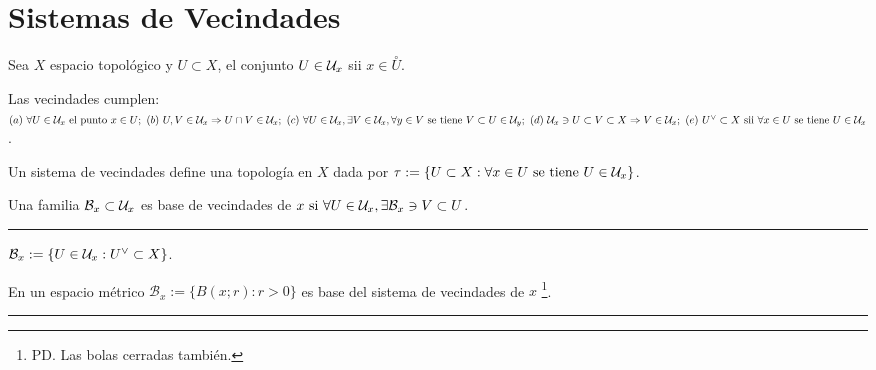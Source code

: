 \section*{Sistemas de Vecindades}

\begin{definition}
    Sea \(X\) espacio topológico y \(U\subset X\), el conjunto \( U \in \mathcal{U}_x\) sii \(x\in \overset{\circ}{U}\). 
\end{definition}
\begin{proposition}
    Las vecindades cumplen: \((a)\ \forall  U\in \U_x \text{ el punto } x\in U  ;  \ (b)\ U,V\in \U_x \Rightarrow U\cap V \in \U_x; \ (c)\ \forall  U\in \U_x, \exists    V \in \U_x, \forall y\in V \text{ se tiene } V \subset U \in \U_y; \ (d)\ \U_x \ni U\subset V\subset X\Rightarrow  V\in \U_x; \ (e) \ U^\ab\subset X \text{ sii } \forall x\in U \text{ se tiene } U\in \U_x \).  
\end{proposition}
\begin{note}
    Un sistema de vecindades define una topología en \(X\) dada por \(\tau := \{U\subset X : \forall x \in U\text{ se tiene } U\in \mathcal{U}_x \} \). 
\end{note}
\begin{definition}
    Una familia \(\mathcal{B}_x \subset \mathcal{U}_x\) es base de vecindades de \(x\text{ si } \forall  U \in \mathcal{U}_x,\exists  \mathcal{B}_x \ni V \subset U\).
\end{definition}

\E

\hrule 
\begin{example}
    \(\mathcal{B}_x := \{U\in \U_x: U^\ab\subset X\}\). 
\end{example}
\begin{example}
    En un espacio métrico \(\mathcal{B}_x:= \{B(x;r): r>0\}\) es base del sistema de vecindades de \(x\) \footnote{PD. Las bolas cerradas también.}.  
\end{example}
\hrule 

\E

